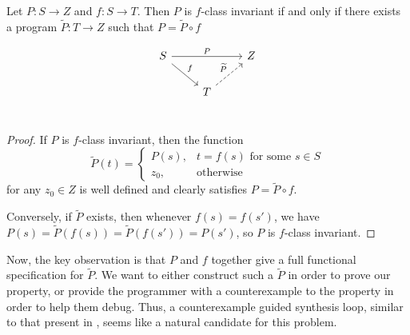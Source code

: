 \documentclass{llncs}
\begin{document}
  \begin{lemma} Let $P : S \to Z$ and $f : S \to T$.
    Then $P$ is $f$-class invariant if and only if
    there exists a program $\widetilde{P} : T\to Z$
    such that $P = \widetilde{P} \circ f$
  \end{lemma}
    \[
      \begin{tikzcd}
        S \arrow{rr}{P} \arrow{rd}{f} &   & Z \\
        & T \arrow[dashed]{ru}{\widetilde{P}} &   \\
      \end{tikzcd}
    \]
  \begin{proof}
    If $P$ is $f$-class invariant, then the function
    \[ \widetilde{P}(t) = \begin{cases}
         P(s), & t = f(s) \text{ for some $s\in S$} \\
         z_0, & \text{otherwise}
       \end{cases}
    \]
    for any $z_0 \in Z$
    is well defined and clearly satisfies $P = \widetilde{P} \circ f$.

    Conversely, if $\widetilde{P}$ exists, then whenever $f(s)=f(s')$,
    we have $P(s) = \widetilde{P}(f(s)) = \widetilde{P}(f(s')) = P(s')$,
    so $P$ is $f$-class invariant.
  \end{proof}

  Now, the key observation is that $P$ and $f$ together give a full functional
  specification for $\widetilde{P}$.
  We want to either construct such a $\widetilde{P}$ in order to prove our
  property, or provide the programmer with a counterexample to the property in
  order to help them debug.
  Thus, a counterexample guided synthesis loop,
  similar to that present in \cite{solar06},
  seems like a natural candidate for this problem.
\end{document}
